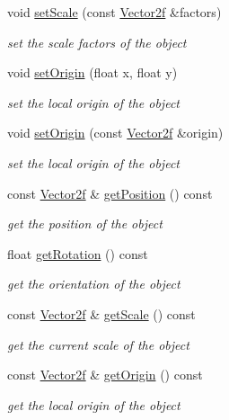 \begin{DoxyCompactItemize}
void \hyperlink{classsf_1_1Transformable_a4c48a87f1626047e448f9c1a68ff167e}{set\+Scale} (const \hyperlink{classsf_1_1Vector2}{Vector2f} \&factors)
\begin{DoxyCompactList}\small\item\em set the scale factors of the object \end{DoxyCompactList}\item 
void \hyperlink{classsf_1_1Transformable_a56c67bd80aae8418d13fb96c034d25ec}{set\+Origin} (float x, float y)
\begin{DoxyCompactList}\small\item\em set the local origin of the object \end{DoxyCompactList}\item 
void \hyperlink{classsf_1_1Transformable_aa93a835ffbf3bee2098dfbbc695a7f05}{set\+Origin} (const \hyperlink{classsf_1_1Vector2}{Vector2f} \&origin)
\begin{DoxyCompactList}\small\item\em set the local origin of the object \end{DoxyCompactList}\item 
const \hyperlink{classsf_1_1Vector2}{Vector2f} \& \hyperlink{classsf_1_1Transformable_a73f9739bc6e74db2cea154bc8e94ec46}{get\+Position} () const
\begin{DoxyCompactList}\small\item\em get the position of the object \end{DoxyCompactList}\item 
float \hyperlink{classsf_1_1Transformable_aa00b5c5d4a06ac24a94dd72c56931d3a}{get\+Rotation} () const
\begin{DoxyCompactList}\small\item\em get the orientation of the object \end{DoxyCompactList}\item 
const \hyperlink{classsf_1_1Vector2}{Vector2f} \& \hyperlink{classsf_1_1Transformable_a73819fdea80ca8a06fad8a0067b4588c}{get\+Scale} () const
\begin{DoxyCompactList}\small\item\em get the current scale of the object \end{DoxyCompactList}\item 
const \hyperlink{classsf_1_1Vector2}{Vector2f} \& \hyperlink{classsf_1_1Transformable_a37ea3500afac234814a43ce809ef264e}{get\+Origin} () const
\begin{DoxyCompactList}\small\item\em get the local origin of the object \end{DoxyCompactList}\item 

\end{DoxyCompactItemize}
